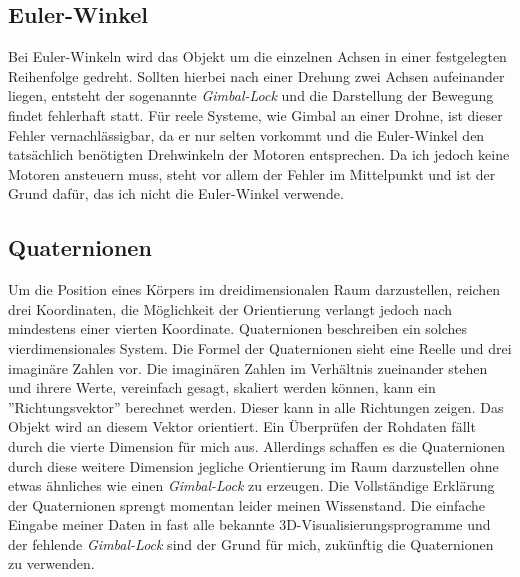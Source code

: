 \subsection{Euler-Winkel}
Bei Euler-Winkeln wird das Objekt um die einzelnen Achsen in einer festgelegten Reihenfolge gedreht. Sollten hierbei 
nach einer Drehung zwei Achsen aufeinander liegen, entsteht der sogenannte \textit{Gimbal-Lock} und die Darstellung
der Bewegung findet fehlerhaft statt. Für reele Systeme, wie Gimbal an einer Drohne, ist dieser Fehler vernachlässigbar,
da er nur selten vorkommt und die Euler-Winkel den tatsächlich benötigten Drehwinkeln der Motoren entsprechen.
Da ich jedoch keine Motoren ansteuern muss, steht vor allem der Fehler im Mittelpunkt und ist der Grund dafür, das ich nicht
die Euler-Winkel verwende.  

\subsection{Quaternionen}
Um die Position eines Körpers im dreidimensionalen Raum darzustellen, reichen drei Koordinaten, 
die Möglichkeit der Orientierung verlangt jedoch nach mindestens einer vierten Koordinate. 
Quaternionen beschreiben ein solches vierdimensionales System.
Die Formel der Quaternionen sieht eine Reelle und drei imaginäre Zahlen vor.
Die imaginären Zahlen im Verhältnis zueinander stehen und ihrere Werte, vereinfach gesagt, skaliert werden können, kann 
ein ''Richtungsvektor'' berechnet werden. Dieser kann in alle Richtungen zeigen. Das Objekt wird an diesem Vektor orientiert.
Ein Überprüfen der Rohdaten fällt durch die vierte Dimension für mich aus.
Allerdings schaffen es die Quaternionen durch diese weitere Dimension jegliche Orientierung im Raum darzustellen ohne
etwas ähnliches wie einen \textit{Gimbal-Lock} zu erzeugen. Die Vollständige Erklärung der Quaternionen sprengt momentan
leider meinen Wissenstand. Die einfache Eingabe meiner Daten in fast alle bekannte 3D-Visualisierungsprogramme und 
der fehlende \textit{Gimbal-Lock} sind der Grund für mich, zukünftig die Quaternionen zu verwenden.